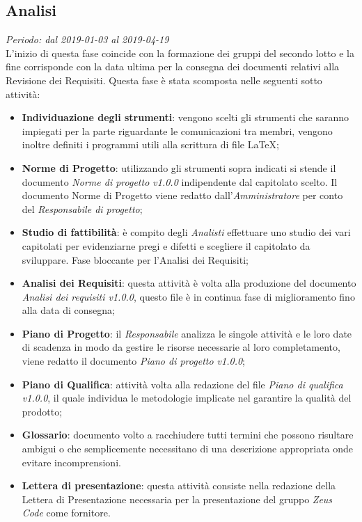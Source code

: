 \subsection{Analisi}
\textit{Periodo: dal 2019-01-03 al 2019-04-19}\\
L'inizio di questa fase coincide con la formazione dei gruppi del secondo lotto e la fine corrisponde con la data ultima per la consegna dei documenti relativi alla Revisione dei Requisiti.
Questa fase è stata scomposta nelle seguenti sotto attività:
\begin{itemize}
	\item \textbf{Individuazione degli strumenti}: vengono scelti gli strumenti che saranno impiegati per la parte riguardante le comunicazioni tra membri, vengono inoltre definiti i programmi utili alla scrittura di file \LaTeX; 
	\item \textbf{Norme di Progetto}: utilizzando gli strumenti sopra indicati si stende il documento \textit{Norme di progetto v1.0.0} indipendente dal capitolato scelto. Il documento Norme di Progetto viene redatto dall'\textit{Amministratore} per conto del \textit{Responsabile di progetto};
	\item \textbf{Studio di fattibilità}: è compito degli \textit{Analisti} effettuare uno studio dei vari capitolati per evidenziarne pregi e difetti e scegliere il capitolato da sviluppare. Fase bloccante per l'Analisi dei Requisiti;
	\item \textbf{Analisi dei Requisiti}: questa attività è volta alla produzione del documento \textit{Analisi dei requisiti v1.0.0}, questo file è in continua fase di miglioramento fino alla data di consegna;
	\item \textbf{Piano di Progetto}: il \textit{Responsabile} analizza le singole attività e le loro date di scadenza in modo da gestire le risorse necessarie al loro completamento, viene redatto il documento \textit{Piano di progetto v1.0.0};
	\item \textbf{Piano di Qualifica}: attività volta alla redazione del file \textit{Piano di qualifica v1.0.0}, il quale individua le metodologie implicate nel garantire la qualità del prodotto; 
	\item \textbf{Glossario}: documento volto a racchiudere tutti termini che possono risultare ambigui o che semplicemente necessitano di una descrizione appropriata onde evitare incomprensioni.
	\item \textbf{Lettera di presentazione}: questa attività consiste nella redazione della Lettera di Presentazione necessaria  per  la  presentazione del gruppo \textit{Zeus Code} come fornitore.
\end{itemize}

